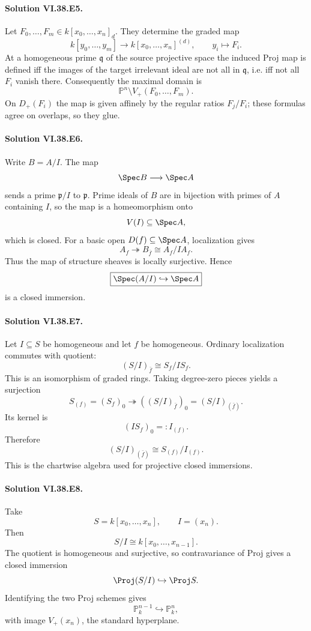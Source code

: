 \paragraph{Solution VI.38.E5.}
Let \(F_0,\ldots,F_m\in k[x_0,\ldots,x_n]_d\).  They determine the graded map
\[
k[y_0,\ldots,y_m]\longrightarrow k[x_0,\ldots,x_n]^{(d)},
\qquad y_i\longmapsto F_i.
\]
At a homogeneous prime \(\mathfrak q\) of the source projective space the induced
Proj map is defined iff the images of the target irrelevant ideal are not all in
\(\mathfrak q\), i.e. iff not all \(F_i\) vanish there. Consequently the maximal
domain is
\[
\boxed{\mathbb P^n\setminus V_+(F_0,\ldots,F_m)}.
\]
On \(D_+(F_i)\) the map is given affinely by the regular ratios
\(F_j/F_i\); these formulas agree on overlaps, so they glue.

\paragraph{Solution VI.38.E6.}
Write \(B=A/I\).  The map
\[
\Spec B\longrightarrow\Spec A
\]
sends a prime \(\mathfrak p/I\) to \(\mathfrak p\).  Prime ideals of \(B\) are in
bijection with primes of \(A\) containing \(I\), so the map is a homeomorphism onto
\[
V(I)\subseteq\Spec A,
\]
which is closed.  For a basic open \(D(f)\subseteq\Spec A\), localization gives
\[
A_f\twoheadrightarrow B_{\bar f}\cong A_f/IA_f.
\]
Thus the map of structure sheaves is locally surjective.  Hence
\[
\boxed{\Spec(A/I)\hookrightarrow\Spec A}
\]
is a closed immersion.

\paragraph{Solution VI.38.E7.}
Let \(I\subseteq S\) be homogeneous and let \(f\) be homogeneous. Ordinary
localization commutes with quotient:
\[
(S/I)_{\bar f}\cong S_f/IS_f.
\]
This is an isomorphism of graded rings. Taking degree-zero pieces yields a
surjection
\[
S_{(f)}=(S_f)_0\twoheadrightarrow ((S/I)_{\bar f})_0=(S/I)_{(\bar f)}.
\]
Its kernel is
\[
(IS_f)_0=:I_{(f)}.
\]
Therefore
\[
\boxed{(S/I)_{(\bar f)}\cong S_{(f)}/I_{(f)}}.
\]
This is the chartwise algebra used for projective closed immersions.

\paragraph{Solution VI.38.E8.}
Take
\[
S=k[x_0,\ldots,x_n],\qquad I=(x_n).
\]
Then
\[
S/I\cong k[x_0,\ldots,x_{n-1}].
\]
The quotient is homogeneous and surjective, so contravariance of Proj gives a
closed immersion
\[
\Proj(S/I)\hookrightarrow\Proj S.
\]
Identifying the two Proj schemes gives
\[
\boxed{\mathbb P^{n-1}_k\hookrightarrow\mathbb P^n_k},
\]
with image \(V_+(x_n)\), the standard hyperplane.

